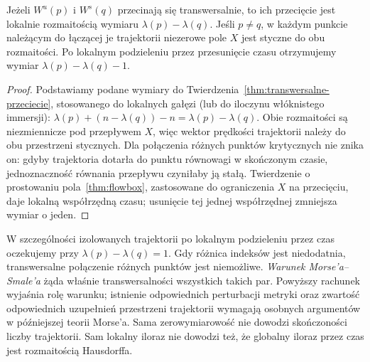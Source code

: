 \begin{wniosek}
\label{cor:smale-wymiar}
Jeżeli $W^u(p)$ i $W^s(q)$ przecinają się
transwersalnie, to ich przecięcie jest lokalnie
rozmaitością wymiaru
$\lambda(p)-\lambda(q)$.
Jeśli $p\ne q$, w każdym punkcie należącym
do łączącej je trajektorii niezerowe pole
$X$ jest styczne do obu rozmaitości.
Po lokalnym podzieleniu przez przesunięcie
czasu otrzymujemy wymiar
$\lambda(p)-\lambda(q)-1$.
\end{wniosek}
\begin{proof}
Podstawiamy podane wymiary do
Twierdzenia~\ref{thm:transwersalne-przeciecie}, stosowanego
do lokalnych gałęzi (lub do iloczynu włóknistego immersji):
$\lambda(p)+(n-\lambda(q))-n
=\lambda(p)-\lambda(q)$.
Obie rozmaitości są niezmiennicze
pod przepływem $X$, więc wektor prędkości
trajektorii należy do obu przestrzeni
stycznych. Dla połączenia różnych
punktów krytycznych nie znika on:
gdyby trajektoria dotarła do punktu
równowagi w skończonym czasie,
jednoznaczność równania przepływu
czyniłaby ją stałą. Twierdzenie o prostowaniu
pola~\ref{thm:flowbox}, zastosowane do ograniczenia $X$
na przecięciu, daje lokalną współrzędną czasu; usunięcie tej jednej współrzędnej
zmniejsza wymiar o jeden.
\end{proof}

W szczególności izolowanych trajektorii
po lokalnym podzieleniu przez czas oczekujemy przy
$\lambda(p)-\lambda(q)=1$. Gdy różnica
indeksów jest niedodatnia, transwersalne
połączenie różnych punktów jest niemożliwe.
\emph{Warunek Morse'a--Smale'a} żąda właśnie
transwersalności wszystkich takich par.
Powyższy rachunek wyjaśnia rolę warunku;
istnienie odpowiednich perturbacji metryki
oraz zwartość odpowiednich uzupełnień przestrzeni trajektorii
wymagają osobnych argumentów w późniejszej teorii Morse'a.
Sama zerowymiarowość nie dowodzi skończoności liczby
trajektorii. Sam lokalny iloraz nie dowodzi też, że
globalny iloraz przez czas jest rozmaitością Hausdorffa.

